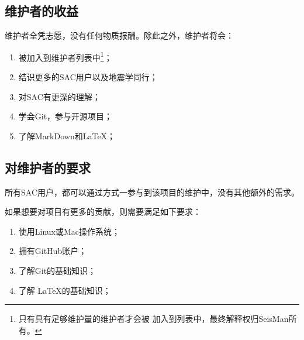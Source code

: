 \subsection{维护者的收益}
维护者全凭志愿，没有任何物质报酬。除此之外，维护者将会：
\begin{enumerate}
\item 被加入到维护者列表中\footnote{只有具有足够维护量的维护者才会被
    加入到列表中，最终解释权归SeisMan所有。}；
\item 结识更多的SAC用户以及地震学同行；
\item 对SAC有更深的理解；
\item 学会Git，参与开源项目；
\item 了解MarkDown和\LaTeX ；
\end{enumerate}

\subsection{对维护者的要求}
所有SAC用户，都可以通过方式一参与到该项目的维护中，没有其他额外的需求。

如果想要对项目有更多的贡献，则需要满足如下要求：
\begin{enumerate}
\item 使用Linux或Mac操作系统；
\item 拥有GitHub账户；
\item 了解Git的基础知识；
\item 了解 \LaTeX 的基础知识；
\end{enumerate}
